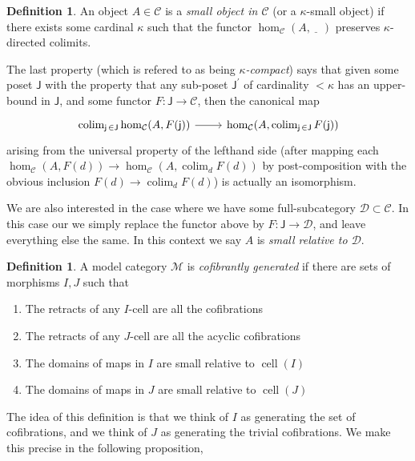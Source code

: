 \documentclass{amsart}
\DeclareMathOperator{\cell}{cell}
\DeclareMathOperator{\colim}{colim}
\theoremstyle{definition}
\newtheorem{definition}[theorem]{Definition}
\begin{document}
  \begin{definition}
    An object $A\in \mathcal{C}$  is a
    \textit{small object in $\mathcal{C}$} (or a $\kappa$-small object)
    if there exists some cardinal $\kappa$ such that the
    functor $\hom_\mathcal{C}(A,\underline{\phantom{A}}\,) $ preserves $\kappa$-directed colimits.
  \end{definition}
  The last property (which is refered to as being \textit{$\kappa$-compact})
  says that given some poset $\mathsf{J}$ with the property that any
  sub-poset $\mathsf{J}^\prime$ of cardinality $<\kappa$ has an upper-bound in
  $\mathsf{J}$,  and some functor $F: \mathsf{J}\to \mathcal{C}$,
  then the canonical map
    \[
      \begin{tikzcd}
        \colim_{\mathsf{j} \,\in \mathsf{J}} \hom_\mathcal{C}(A,
        F(\mathsf{j}))\arrow[r]
        & \hom_\mathcal{C}(A,
        \colim_ {\mathsf{j} \,\in \mathsf{J}} F(\mathsf{j}))
      \end{tikzcd}
    \]
    arising from the universal property of the lefthand side (after mapping each
    $\hom_\mathcal{C}(A,F(d)) \to \hom_\mathcal{C}(A, \colim_d F(d))$ by
    post-composition with the obvious inclusion $F(d)\to \colim_d F(d)$)
    is actually an isomorphism.

    We are also interested in the case where we have some full-subcategory
    $\mathcal{D}\subset \mathcal{C}$. In this case our
    we simply replace the functor above by $F: \mathsf{J}\to \mathcal{D}$,
    and leave everything else the same. In this context we say
    $A$ is \textit{small relative to $\mathcal{D}$}.


    
  \begin{definition}
    A model category $\mathcal{M}$ is \textit{cofibrantly generated} if
    there are sets of morphisms $I,J$ such that
    \begin{enumerate}
    \item The retracts of any $I$-cell are all the
      cofibrations
    \item The retracts of any $J$-cell are all the
      acyclic cofibrations
    \item The domains of maps in $I$ are small relative to
      $\cell(I)$
    \item The domains of maps in $J$ are small relative to
      $\cell(J)$
    \end{enumerate}
  \end{definition}
  The idea of this definition is that we think of $I$ as generating the set
  of cofibrations, and we think of $J$ as generating the trivial cofibrations.
  We make this precise in the following proposition,
\end{document}
